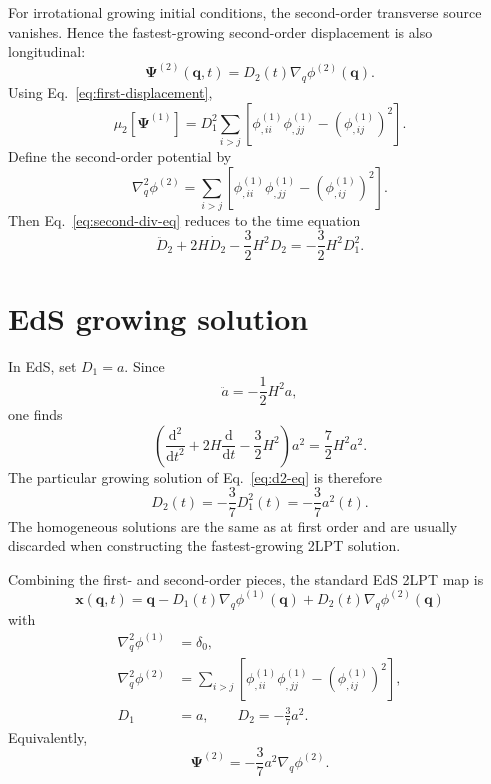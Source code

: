 \documentclass[11pt]{article}
\newcommand{\dd}{\mathrm{d}}
\newcommand{\gradq}{\nabla_{\!q}}
\newcommand{\lapq}{\nabla_{\!q}^{2}}
\newcommand{\PsiL}{\bm{\Psi}}
\newcommand{\xv}{\bm{x}}
\newcommand{\qv}{\bm{q}}
\begin{document}
For irrotational growing initial conditions, the second-order transverse
source vanishes.  Hence the fastest-growing second-order displacement is also
longitudinal:
\begin{equation}
  \PsiL^{(2)}(\qv,t)=D_2(t)\gradq\phi^{(2)}(\qv).
  \label{eq:second-ansatz}
\end{equation}
Using Eq.~\eqref{eq:first-displacement},
\begin{equation}
  \mu_2\!\left[\PsiL^{(1)}\right]
  =
  D_1^2
  \sum_{i>j}
  \left[
    \phi^{(1)}_{,ii}\phi^{(1)}_{,jj}
    -\left(\phi^{(1)}_{,ij}\right)^2
  \right].
\end{equation}
Define the second-order potential by
\begin{equation}
  \lapq\phi^{(2)}
  =
  \sum_{i>j}
  \left[
    \phi^{(1)}_{,ii}\phi^{(1)}_{,jj}
    -\left(\phi^{(1)}_{,ij}\right)^2
  \right].
  \label{eq:phi2-poisson}
\end{equation}
Then Eq.~\eqref{eq:second-div-eq} reduces to the time equation
\begin{equation}
  \ddot D_2+2H\dot D_2-\frac{3}{2}H^2D_2
  =
  -\frac{3}{2}H^2D_1^2 .
  \label{eq:d2-eq}
\end{equation}

\section{EdS growing solution}

In EdS, set $D_1=a$.  Since
\begin{equation}
  \ddot a = -\frac{1}{2}H^2a,
\end{equation}
one finds
\begin{equation}
  \left(
    \frac{\dd^2}{\dd t^2}
    +2H\frac{\dd}{\dd t}
    -\frac{3}{2}H^2
  \right)a^2
  =
  \frac{7}{2}H^2a^2.
\end{equation}
The particular growing solution of Eq.~\eqref{eq:d2-eq} is therefore
\begin{equation}
  D_2(t)=-\frac{3}{7}D_1^2(t)
        =-\frac{3}{7}a^2(t).
  \label{eq:d2-eds}
\end{equation}
The homogeneous solutions are the same as at first order and are usually
discarded when constructing the fastest-growing 2LPT solution.

Combining the first- and second-order pieces, the standard EdS 2LPT map is
\begin{equation}
  \boxed{
  \xv(\qv,t)
  =
  \qv
  -D_1(t)\gradq\phi^{(1)}(\qv)
  +D_2(t)\gradq\phi^{(2)}(\qv)
  }
\end{equation}
with
\begin{align}
  \lapq\phi^{(1)} &= \delta_0,\\
  \lapq\phi^{(2)}
  &=
  \sum_{i>j}
  \left[
    \phi^{(1)}_{,ii}\phi^{(1)}_{,jj}
    -\left(\phi^{(1)}_{,ij}\right)^2
  \right],\\
  D_1 &= a,\qquad D_2=-\frac{3}{7}a^2.
\end{align}
Equivalently,
\begin{equation}
  \PsiL^{(2)}
  =
  -\frac{3}{7}a^2\gradq\phi^{(2)}.
\end{equation}
\end{document}
